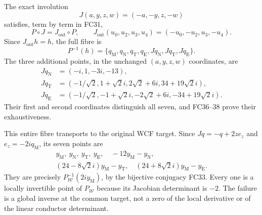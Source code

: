 \documentclass[11pt]{article}
\begin{document}
The exact involution
\[
 J(a,y,z,w)=(-a,-y,z,-w)
\]
satisfies, term by term in FC31,
\[
 P\circ J=J_{\mathrm{out}}\circ P,\qquad
 J_{\mathrm{out}}(u_0,u_2,u_3,u_4)=(-u_0,-u_2,u_3,-u_4).
 \tag{FC39}
\]
Since $J_{\mathrm{out}}h=h$, the full fibre is
\[
 P^{-1}(h)=\{q_{\mathrm M},q_{\mathrm N},q_{\mathrm T},q_{\mathrm E},
              Jq_{\mathrm N},Jq_{\mathrm T},Jq_{\mathrm E}\}.
 \tag{FC40}
\]
The three additional points, in the unchanged $(a,y,z,w)$ coordinates,
are
\[
\begin{aligned}
 Jq_{\mathrm N}&=(-i,1,-3i,-13),\\
 Jq_{\mathrm T}&=(-1/\sqrt2,1+\sqrt2i,2\sqrt2+6i,34+19\sqrt2i),\\
 Jq_{\mathrm E}&=(-1/\sqrt2,-1+\sqrt2i,-2\sqrt2+6i,-34+19\sqrt2i).
\end{aligned}\tag{FC41}
\]
Their first and second coordinates distinguish all seven, and FC36--38
prove their exhaustiveness.

This entire fibre transports to the original WCF target. Since
$Jq=-q+2z e_z$ and $e_z=-2i q_{\mathrm M}$, its seven points are
\[
\begin{gathered}
 y_{\mathrm M},\ y_{\mathrm N},\ y_{\mathrm T},\ y_{\mathrm E},\quad
 -12y_{\mathrm M}-y_{\mathrm N},\\
 (24-8\sqrt2i)y_{\mathrm M}-y_{\mathrm T},\quad
 (24+8\sqrt2i)y_{\mathrm M}-y_{\mathrm E}.
\end{gathered}\tag{FC42}
\]
They are precisely $P_{\mathcal W}^{-1}(2iy_{\mathrm M})$, by the
bijective conjugacy FC33. Every one is a locally invertible point of
$P_{\mathcal W}$ because its Jacobian determinant is $-2$.
The failure is a global inverse at the common target, not a zero of
the local derivative or of the linear conductor determinant.
\end{document}
